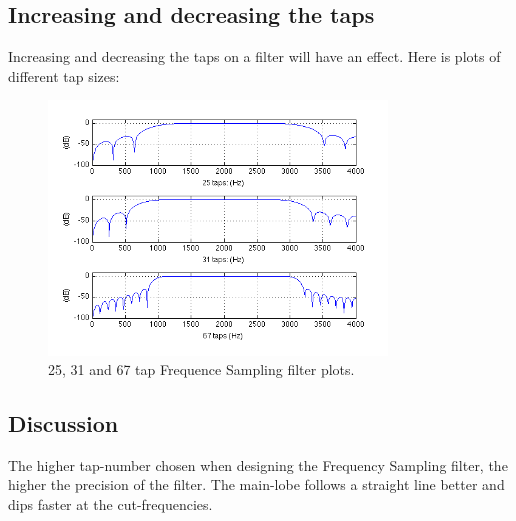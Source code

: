 \documentclass[a4wide,10pt]{article}
\begin{document}
		\subsection{Increasing and decreasing the taps} %
		\label{sub:increasing_and_decreasing_the_taps}
		Increasing and decreasing the taps on a filter will have an effect. Here is plots of different tap sizes:
		\begin{figure}[h]
			\centering
				\includegraphics[width=9cm]{images/opgave_3_b.png}
			\caption{25, 31 and 67 tap Frequence Sampling filter plots.}
			\label{fig:images_opgave_3_b}
		\end{figure}
		\subsection{Discussion} %
		\label{sub:discussion}
			The higher tap-number chosen when designing the Frequency Sampling filter, the higher the precision of the filter. The main-lobe follows a straight line better and dips faster at the cut-frequencies.
\end{document}
